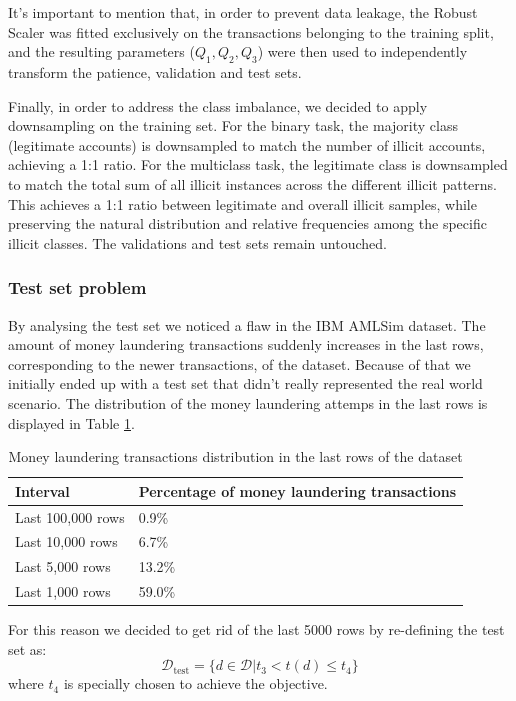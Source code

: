It's important to mention that, in order to prevent data leakage, the Robust Scaler was fitted exclusively on the transactions belonging to the training split, and the resulting parameters ($Q_1, Q_2, Q_3$) were then used to independently transform the patience, validation and test sets.

Finally, in order to address the class imbalance, we decided to apply downsampling on the training set.
For the binary task, the majority class (legitimate accounts) is downsampled to match the number of illicit accounts, achieving a 1:1 ratio. 
For the multiclass task, the legitimate class is downsampled to match the total sum of all illicit instances across the different illicit patterns. This achieves a 1:1 ratio between legitimate and overall illicit samples, while preserving the natural distribution and relative frequencies among the specific illicit classes. 
The validations and test sets remain untouched.

\subsubsection{Test set problem}
By analysing the test set we noticed a flaw in the IBM AMLSim dataset. The amount of money laundering transactions suddenly increases in the last rows, corresponding to the newer transactions, of the dataset. Because of that we initially ended up with a test set that didn't really represented the real world scenario. The distribution of the money laundering attemps in the last rows is displayed in Table \ref{tab:distributionlastrow}.
\begin{table}
\centering
\begin{tabular}{l l }
\hline
\textbf{Interval} & \textbf{Percentage of money laundering transactions} \\
\hline
Last 100,000 rows & 0.9\% \\
Last 10,000 rows & 6.7\% \\
Last 5,000 rows & 13.2\% \\
Last 1,000 rows & 59.0\% \\
\hline
\end{tabular}
\caption{Money laundering transactions distribution in the last rows of the dataset}
\label{tab:distributionlastrow}
\end{table}
For this reason we decided to get rid of the last 5000 rows by re-defining the test set as:
\begin{equation}
  \mathcal{D}_\text{test} = \{d \in \mathcal{D} \vert t_3 < t(d) \le t_4 \}
\end{equation}
where \(t_4\) is specially chosen to achieve the objective. 

